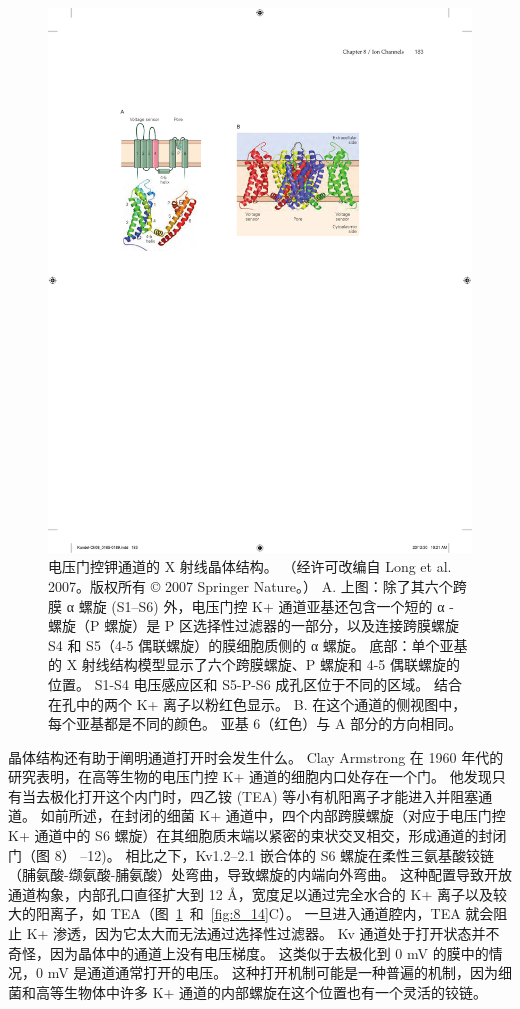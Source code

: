 \begin{figure}[htbp]
	\centering
	\includegraphics[width=0.5\linewidth]{chap08/fig_8_13}
	\caption{电压门控钾通道的 X 射线晶体结构。 （经许可改编自 Long et al. 2007。版权所有 © 2007 Springer Nature。） A. 上图：除了其六个跨膜 α 螺旋 (S1–S6) 外，电压门控 K+ 通道亚基还包含一个短的 α - 螺旋（P 螺旋）是 P 区选择性过滤器的一部分，以及连接跨膜螺旋 S4 和 S5（4-5 偶联螺旋）的膜细胞质侧的 α 螺旋。 底部：单个亚基的 X 射线结构模型显示了六个跨膜螺旋、P 螺旋和 4-5 偶联螺旋的位置。 S1-S4 电压感应区和 S5-P-S6 成孔区位于不同的区域。 结合在孔中的两个 K+ 离子以粉红色显示。 B. 在这个通道的侧视图中，每个亚基都是不同的颜色。 亚基 6（红色）与 A 部分的方向相同。}
	\label{fig:8_13}
\end{figure}


晶体结构还有助于阐明通道打开时会发生什么。
Clay Armstrong 在 1960 年代的研究表明，在高等生物的电压门控 K+ 通道的细胞内口处存在一个门。
他发现只有当去极化打开这个内门时，四乙铵 (TEA) 等小有机阳离子才能进入并阻塞通道。
如前所述，在封闭的细菌 K+ 通道中，四个内部跨膜螺旋（对应于电压门控 K+ 通道中的 S6 螺旋）在其细胞质末端以紧密的束状交叉相交，形成通道的封闭门（图 8） –12)。
相比之下，Kv1.2–2.1 嵌合体的 S6 螺旋在柔性三氨基酸铰链（脯氨酸-缬氨酸-脯氨酸）处弯曲，导致螺旋的内端向外弯曲。
这种配置导致开放通道构象，内部孔口直径扩大到 12 Å，宽度足以通过完全水合的 K+ 离子以及较大的阳离子，如 TEA（图~\ref{fig:8_13}~和~\ref{fig:8_14}C）。
一旦进入通道腔内，TEA 就会阻止 K+ 渗透，因为它太大而无法通过选择性过滤器。
Kv 通道处于打开状态并不奇怪，因为晶体中的通道上没有电压梯度。
这类似于去极化到 0 mV 的膜中的情况，0 mV 是通道通常打开的电压。
这种打开机制可能是一种普遍的机制，因为细菌和高等生物体中许多 K+ 通道的内部螺旋在这个位置也有一个灵活的铰链。


